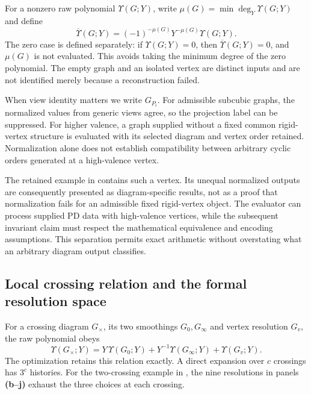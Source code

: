 \documentclass[10pt,twocolumn]{article}
\begin{document}
For a nonzero raw polynomial $\Upsilon(G;Y)$, write $\mu(G)=\min\deg_Y\Upsilon(G;Y)$ and define
\begin{equation}
\overline{\Upsilon}(G;Y)=(-1)^{-\mu(G)}Y^{-\mu(G)}\Upsilon(G;Y).
\label{suppeq:yamada_normalization}
\end{equation}
The zero case is defined separately: if $\Upsilon(G;Y)=0$, then $\overline{\Upsilon}(G;Y)=0$, and $\mu(G)$ is not evaluated. This avoids taking the minimum degree of the zero polynomial. The empty graph and an isolated vertex are distinct inputs and are not identified merely because a reconstruction failed.

When view identity matters we write $G_{P_i}$. For admissible subcubic graphs, the normalized values from generic views agree, so the projection label can be suppressed. For higher valence, a graph supplied without a fixed common rigid-vertex structure is evaluated with its selected diagram and vertex order retained. Normalization alone does not establish compatibility between arbitrary cyclic orders generated at a high-valence vertex.

The retained example in  contains such a vertex. Its unequal normalized outputs are consequently presented as diagram-specific results, not as a proof that normalization fails for an admissible fixed rigid-vertex object. The evaluator can process supplied PD data with high-valence vertices, while the subsequent invariant claim must respect the mathematical equivalence and encoding assumptions. This separation permits exact arithmetic without overstating what an arbitrary diagram output classifies.

\subsection{Local crossing relation and the formal resolution space}
\label{supp:local_yamada_relation}
For a crossing diagram $G_\times$, its two smoothings $G_0,G_\infty$ and vertex resolution $G_v$, the raw polynomial obeys
\begin{equation}
\Upsilon(G_\times;Y)=Y\,\Upsilon(G_0;Y)+Y^{-1}\Upsilon(G_\infty;Y)+\Upsilon(G_v;Y).
\label{suppeq:yamada_local_relation}
\end{equation}
The optimization retains this relation exactly. A direct expansion over $c$ crossings has $3^c$ histories. For the two-crossing example in , the nine resolutions in panels \textbf{(b--j)} exhaust the three choices at each crossing.
\end{document}
